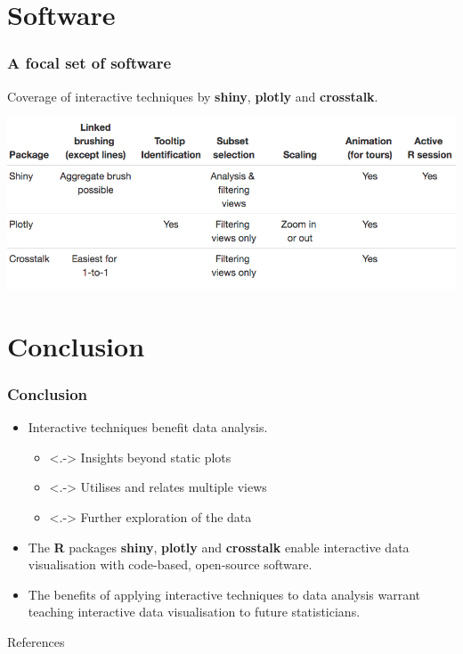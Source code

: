 \documentclass{beamer}
\begin{document}
\section{Software}
\label{sec:software}

\begin{frame}
		\frametitle{A focal set of software}
		Coverage of interactive techniques by \textbf{shiny}, \textbf{plotly} and \textbf{crosstalk}.
		\begin{center}
			\includegraphics[scale=0.38]{files/table.jpeg}
		\end{center}
\end{frame}

\section{Conclusion}
\label{sec:conclusion}

\begin{frame}
\frametitle{Conclusion}
	\begin{itemize}[<+->]
		\item Interactive techniques benefit data analysis.
		\begin{itemize} 
			\item <.-> Insights beyond static plots
			\item <.-> Utilises and relates multiple views 
			\item <.-> Further exploration of the data
		\end{itemize}
		\item The \textbf{R} packages \textbf{shiny}, \textbf{plotly} and \textbf{crosstalk} enable interactive data visualisation with code-based, open-source software.
		\item The benefits of applying interactive techniques to data analysis warrant teaching interactive data visualisation to future statisticians.
	\end{itemize}
\end{frame}

\begin{frame}[allowframebreaks]{References}
	
	
	\nocite{R}
	\nocite{plotly_R}
	\nocite{crosstalk_R}
	\nocite{shiny_R}
\end{frame}
\end{document}
